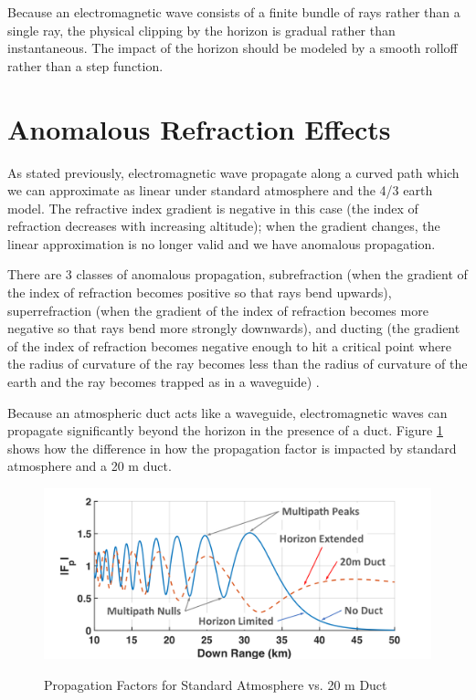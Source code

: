 Because an electromagnetic wave consists of a finite bundle of rays rather than a single ray, the physical clipping by the horizon is gradual rather than instantaneous. The impact of the horizon should be modeled by a smooth rolloff rather than a step function.
  
\section{Anomalous Refraction Effects}
As stated previously, electromagnetic wave propagate along a curved path which we can approximate as linear under standard atmosphere and the 4/3 earth model. The refractive index gradient is negative in this case (the index of refraction decreases with increasing altitude); when the gradient changes, the linear approximation is no longer valid and we have anomalous propagation. 

There are 3 classes of anomalous propagation, subrefraction (when the gradient of the index of refraction becomes positive so that rays bend upwards), superrefraction (when the gradient of the index of refraction becomes more negative so that rays bend more strongly downwards), and ducting (the gradient of the index of refraction becomes negative enough to hit a critical point where the radius of curvature of the ray becomes less than the radius of curvature of the earth and the ray becomes trapped as in a waveguide) \cite{blake_radar}.

Because an atmospheric duct acts like a waveguide, electromagnetic waves can propagate significantly beyond the horizon in the presence of a duct. Figure \ref{env_fig:2z} shows how the difference in how the propagation factor is impacted by standard atmosphere and a 20 m duct.
\begin{figure}[H]
  \begin{center}
\includegraphics[width=5in]{../media/multistatic/multipath.png}
  \end{center}
  \renewcommand{\baselinestretch}{1} \small\normalsize
  \begin{quote}
    \caption[Propagation Factors for Standard Atmosphere vs. 20 m Duct]{Propagation Factors for Standard Atmosphere vs. 20 m Duct\label{env_fig:2z}}
  \end{quote}
\end{figure}
\renewcommand{\baselinestretch}{2} \small\normalsize

